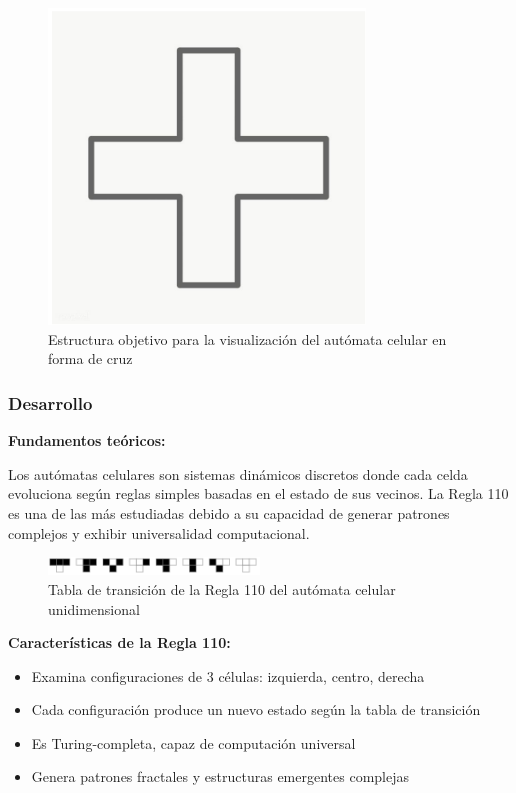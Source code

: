 \documentclass[a4paper,12pt]{article}
\theoremstyle{mytheor}
\begin{document}
\begin{figure}[H]
    \centering
    \includegraphics[width=0.75\textwidth]{g11.png}
    \caption{Estructura objetivo para la visualización del autómata celular en forma de cruz}
    \label{fig:automata_objetivo}
\end{figure}

\subsubsection{Desarrollo}

\textbf{Fundamentos teóricos:}

Los autómatas celulares son sistemas dinámicos discretos donde cada celda evoluciona según reglas simples basadas en el estado de sus vecinos. La Regla 110 es una de las más estudiadas debido a su capacidad de generar patrones complejos y exhibir universalidad computacional.

\begin{figure}[H]
    \centering
    \includegraphics[width=0.5\textwidth]{g12.png}
    \caption{Tabla de transición de la Regla 110 del autómata celular unidimensional}
    \label{fig:regla_110}
\end{figure}

\textbf{Características de la Regla 110:}
\begin{itemize}
    \item Examina configuraciones de 3 células: izquierda, centro, derecha
    \item Cada configuración produce un nuevo estado según la tabla de transición
    \item Es Turing-completa, capaz de computación universal
    \item Genera patrones fractales y estructuras emergentes complejas
\end{itemize}
\end{document}
